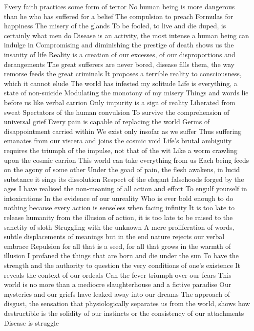\documentclass{article}
\begin{document}
\iffalse
Every faith practices some form of terror
No human being is more dangerous than he who has suffered for a belief
The compulsion to preach
Formulas for happiness
The misery of the glands
To be fooled, to live and die duped, is certainly what men do
Disease is an activity, the most intense a human being can indulge in
Compromising and diminishing the prestige of death shows us the insanity of life
Reality is a creation of our excesses, of our disproportions and derangements
The great sufferers are never bored, disease fills them, the way remorse feeds the great criminals
It proposes a terrible reality to consciousness, which it cannot elude
The world has infested my solitude
Life is everything, a state of non-suicide
Modulating the monotony of my misery
Things and words lie before us like verbal carrion
Only impurity is a sign of reality
Liberated from sweat
Spectators of the human convulsion
To survive the comprehension of universal grief
Every pain is capable of replacing the world
Germs of disappointment carried within
We exist only insofar as we suffer
Thus suffering emanates from our viscera and joins the cosmic void
Life's brutal ambiguity requires the triumph of the impulse, not that of the wit
Like a worm crawling upon the cosmic carrion
This world can take everything from us
Each being feeds on the agony of some other
Under the goad of pain, the flesh awakens, in lucid substance it sings its dissolution
Respect of the elegant falsehoods forged by the ages
I have realised the non-meaning of all action and effort
To engulf yourself in intoxications
In the evidence of our unreality
Who is ever bold enough to do nothing because every action is senseless when facing infinity
It is too late to release humanity from the illusion of action, it is too late to be raised to the sanctity of sloth
Struggling with the unknown
A mere proliferation of words, subtle displacements of meanings but in the end nature rejects our verbal embrace
Repulsion for all that is a seed, for all that grows in the warmth of illusion
I profaned the things that are born and die under the sun
To have the strength and the authority to question the very conditions of one's existence
It reveals the context of our ordeals
Can the fever triumph over our fears
This world is no more than a mediocre slaughterhouse and a fictive paradise
Our mysteries and our griefs have leaked away into our dreams
The approach of disgust, the sensation that physiologically separates us from the world, shows how destructible is the solidity of our instincts or the consistency of our attachments
Disease is struggle
\end{document}

